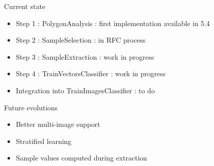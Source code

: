 \documentclass[smaller]{beamer}
\begin{document}
\begin{frame}{Current state}

\begin{itemize}
   \item Step 1 : PolygonAnalysis : first implementation available in 5.4
   \item Step 2 : SampleSelection : in RFC process
   \item Step 3 : SampleExtraction : work in progress
   \item Step 4 : TrainVectorsClassifier : work in progress 
   \item Integration into TrainImagesClassifier : to do
\end{itemize}

\end{frame}

\begin{frame}{Future evolutions}

\begin{itemize}
   \item Better multi-image support
   \item Stratified learning
   \item Sample values computed during extraction
\end{itemize}

\end{frame}
\end{document}

